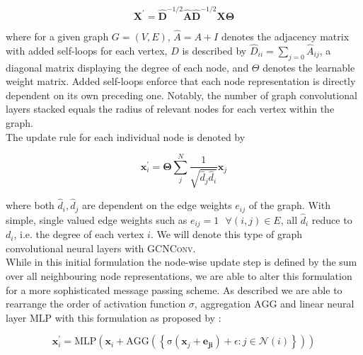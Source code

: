 \documentclass{bioinfo}
\begin{document}
\begin{equation}
	\mathbf{X}^{\prime} = \mathbf{\hat{D}}^{-1/2} \mathbf{\hat{A}}
	\mathbf{\hat{D}}^{-1/2} \mathbf{X} \mathbf{\Theta}
\end{equation}

where for a given graph $G=(V,E)$, $\hat{A} = A + I$ denotes the adjacency matrix with added self-loops for each vertex, $D$ is described by $\hat{D}_{ii} = \sum_{j=0} \hat{A}_{ij}$, a diagonal matrix displaying the degree of each node, and $\Theta$ denotes the learnable weight matrix. Added self-loops enforce that each node representation is directly dependent on its own preceding one. Notably, the number of graph convolutional layers stacked equals the radius of relevant nodes for each vertex within the graph.\\

The update rule for each individual node is denoted by 

\begin{equation}
	\mathbf{x}^{\prime}_i = \mathbf{\Theta} \sum^{N}_{j}
	\frac{1}{\sqrt{\hat{d}_j \hat{d}_i}} \mathbf{x}_j
\end{equation}

where both $\hat{d}_i, \hat{d}_j$ are dependent on the edge weights $e_{ij}$ of the graph. With simple, single valued edge weights such as $e_{ij}=1 \text{ }\forall (i,j)\in E$, all $\hat{d}_i$ reduce to $d_i$, i.e. the degree of each vertex $i$. We will denote this type of graph convolutional neural layers with \textsc{GCNConv}. \\

While in this initial formulation the node-wise update step is defined by the sum over all neighbouring node representations, we are able to alter this formulation for a more sophisticated message passing scheme. As described we are able to rearrange the order of activation function $\sigma$, aggregation $\mathrm{AGG}$ and linear neural layer $\mathrm{MLP}$ with this formulation as proposed by \citet{GENConv2020}:

\begin{equation}
	\mathbf{x}_i^{\prime} = \mathrm{MLP} \left( \mathbf{x}_i +
	\mathrm{AGG} \left( \left\{
	\mathrm{\sigma} \left( \mathbf{x}_j + \mathbf{e_{ji}} \right) +\epsilon
	: j \in \mathcal{N}(i) \right\} \right)
	\right)
\end{equation}
\end{document}
